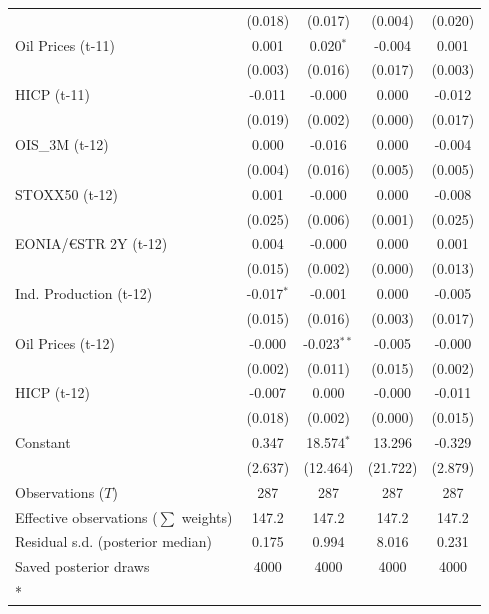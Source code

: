 \begin{longtable}[t]{lcccc}
 & (0.018) & (0.017) & (0.004) & (0.020)\\
Oil Prices (t-11) & 0.001 & 0.020$^{*}$ & -0.004 & 0.001\\
 & (0.003) & (0.016) & (0.017) & (0.003)\\
HICP (t-11) & -0.011 & -0.000 & 0.000 & -0.012\\
 & (0.019) & (0.002) & (0.000) & (0.017)\\
OIS\_3M (t-12) & 0.000 & -0.016 & 0.000 & -0.004\\
 & (0.004) & (0.016) & (0.005) & (0.005)\\
STOXX50 (t-12) & 0.001 & -0.000 & 0.000 & -0.008\\
 & (0.025) & (0.006) & (0.001) & (0.025)\\
EONIA/€STR 2Y (t-12) & 0.004 & -0.000 & 0.000 & 0.001\\
 & (0.015) & (0.002) & (0.000) & (0.013)\\
Ind. Production (t-12) & -0.017$^{*}$ & -0.001 & 0.000 & -0.005\\
 & (0.015) & (0.016) & (0.003) & (0.017)\\
Oil Prices (t-12) & -0.000 & -0.023$^{**}$ & -0.005 & -0.000\\
 & (0.002) & (0.011) & (0.015) & (0.002)\\
HICP (t-12) & -0.007 & 0.000 & -0.000 & -0.011\\
 & (0.018) & (0.002) & (0.000) & (0.015)\\
Constant & 0.347 & 18.574$^{*}$ & 13.296 & -0.329\\
 & (2.637) & (12.464) & (21.722) & (2.879)\\
\midrule
Observations ($T$) & 287 & 287 & 287 & 287\\
Effective observations ($\sum$ weights) & 147.2 & 147.2 & 147.2 & 147.2\\
Residual s.d. (posterior median) & 0.175 & 0.994 & 8.016 & 0.231\\
Saved posterior draws & 4000 & 4000 & 4000 & 4000\\*
\end{longtable}
\endgroup{}

